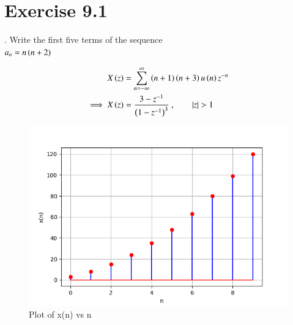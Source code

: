 \documentclass[journal,12pt,twocolumn]{IEEEtran}
\begin{document}


\vspace{3cm}

\title{}
\author{EE23BTECH11024 - G.Karthik Yadav$^{*}$
}
\maketitle
\newpage
\bigskip



\section*{Exercise 9.1}

. \hspace{2pt}Write the first five terms of the sequence\\
$a_n = n \left(n+2\right)$

\solution



\begin{align}
    X \left(z\right) & = \sum_{n=-\infty}^{\infty}  \left(n+1\right)\left(n+3\right) u \left(n\right)   z^{-n} \\
    \implies X \left(z\right) & = \frac{ 3-z^{-1}}{\left(1-z^{-1}\right)^3} \text{ ,}\qquad \left\vert z\right\vert>1
\end{align}

\begin{figure}[ht]
   \centering
   \includegraphics[width=1\columnwidth]{figs/plot1.png}
   \caption{Plot of x(n) vs n}
   \label{fig: 1.11.9.1.1}
\end{figure}
\end{document}
